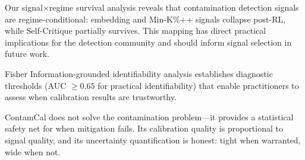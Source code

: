\documentclass[letterpaper]{article}
\begin{document}
Our signal$\times$regime survival analysis reveals that contamination detection signals are regime-conditional: embedding and Min-K\%++ signals collapse post-RL, while Self-Critique partially survives.
This mapping has direct practical implications for the detection community and should inform signal selection in future work.

Fisher Information-grounded identifiability analysis establishes diagnostic thresholds (AUC $\geq 0.65$ for practical identifiability) that enable practitioners to assess when calibration results are trustworthy.

ContamCal does not solve the contamination problem---it provides a statistical safety net for when mitigation fails.
Its calibration quality is proportional to signal quality, and its uncertainty quantification is honest: tight when warranted, wide when not.


\end{document}
